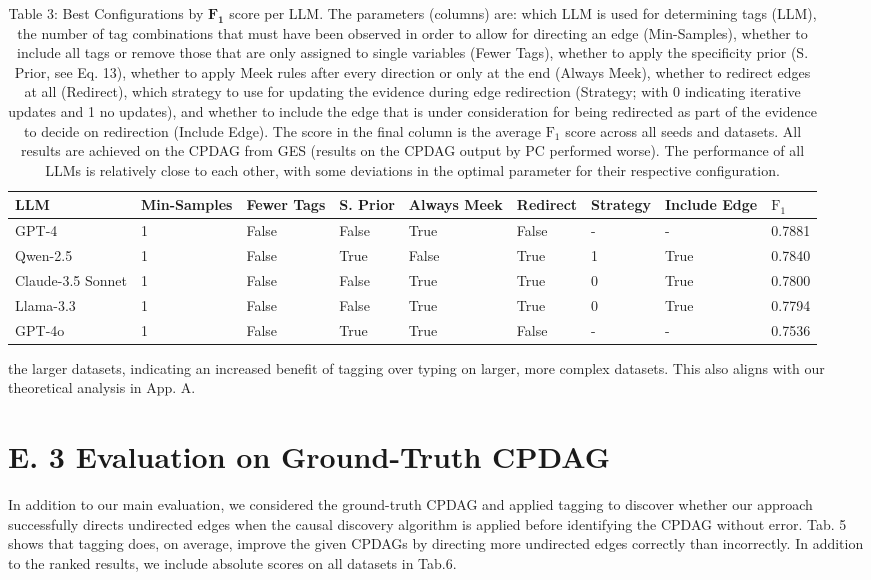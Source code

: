 \documentclass[10pt]{article}
\begin{document}
\begin{table}[h]
\begin{center}
\begin{tabular}{|l|l|l|l|l|l|l|l|l|}
\hline
LLM & Min-Samples & Fewer Tags & S. Prior & Always Meek & Redirect & Strategy & Include Edge & $\mathrm{F}_{1}$ \\
\hline
GPT-4 & 1 & False & False & True & False & - & - & 0.7881 \\
\hline
Qwen-2.5 & 1 & False & True & False & True & 1 & True & 0.7840 \\
\hline
Claude-3.5 Sonnet & 1 & False & False & True & True & 0 & True & 0.7800 \\
\hline
Llama-3.3 & 1 & False & False & True & True & 0 & True & 0.7794 \\
\hline
GPT-4o & 1 & False & True & True & False & - & - & 0.7536 \\
\hline
\end{tabular}
\captionsetup{labelformat=empty}
\caption{Table 3: Best Configurations by $\mathbf{F}_{\mathbf{1}}$ score per LLM. The parameters (columns) are: which LLM is used for determining tags (LLM), the number of tag combinations that must have been observed in order to allow for directing an edge (Min-Samples), whether to include all tags or remove those that are only assigned to single variables (Fewer Tags), whether to apply the specificity prior (S. Prior, see Eq. 13), whether to apply Meek rules after every direction or only at the end (Always Meek), whether to redirect edges at all (Redirect), which strategy to use for updating the evidence during edge redirection (Strategy; with 0 indicating iterative updates and 1 no updates), and whether to include the edge that is under consideration for being redirected as part of the evidence to decide on redirection (Include Edge). The score in the final column is the average $\mathrm{F}_{1}$ score across all seeds and datasets. All results are achieved on the CPDAG from GES (results on the CPDAG output by PC performed worse). The performance of all LLMs is relatively close to each other, with some deviations in the optimal parameter for their respective configuration.}
\end{center}
\end{table}

the larger datasets, indicating an increased benefit of tagging over typing on larger, more complex datasets. This also aligns with our theoretical analysis in App. A.

\section*{E. 3 Evaluation on Ground-Truth CPDAG}
In addition to our main evaluation, we considered the ground-truth CPDAG and applied tagging to discover whether our approach successfully directs undirected edges when the causal discovery algorithm is applied before identifying the CPDAG without error. Tab. 5 shows that tagging does, on average, improve the given CPDAGs by directing more undirected edges correctly than incorrectly. In addition to the ranked results, we include absolute scores on all datasets in Tab.6.
\end{document}
